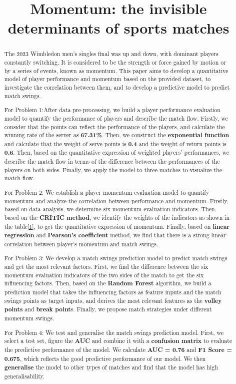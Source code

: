 \documentclass[12pt]{article}  %
\title{Momentum: the invisible determinants of sports matches}  %
\begin{document}
	
	\begin{abstract}
		The 2023 Wimbledon men's singles final was up and down, with dominant players constantly switching. It is considered to be the strength or force gained by motion or by a series of events, known as momentum. This paper aims to develop a quantitative model of player performance and momentum based on the provided dataset, to investigate the correlation between them, and to develop a predictive model to predict match swings.
		
		For Problem 1:After data pre-processing, we build a player performance evaluation model to quantify the performance of players and describe the match flow. Firstly, we consider that the points can reflect the performance of the players, and calculate the winning rate of the server as \textbf{67.31\%}. Then, we construct the \textbf{exponential function} and calculate that the weight of serve points is \textbf{0.4} and the weight of return points is \textbf{0.6}. Then, based on the quantitative expression of weighted players' performances, we describe the match flow in terms of the difference between the performances of the players on both sides. Finally, we apply the model to three matches to visualize the match flow.
		
		For Problem 2: We establish a player momentum evaluation model to quantify momentum and analyze the correlation between performance and momentum. Firstly, based on data analysis, we determine six momentum evaluation indicators. Then, based on the \textbf{CRITIC method}, we identify the weights of the indicators as shown in the table\ref{1}, to get the quantitative expression of momentum. Finally, based on \textbf{linear regression} and \textbf{Pearson's coefficient} method, we find that there is a strong linear correlation between player's momentum and match swings.
		
		For Problem 3: We develop a match swings prediction model to predict match swings and get the most relevant factors. First, we find the difference between the six momentum evaluation indicators of the two sides of the match to get the six influencing factors. Then, based on the \textbf{Random Forest} algorithm, we build a prediction model that takes the influencing factors as feature inputs and the match swings points as target inputs, and derives the most relevant features as the \textbf{volley points} and \textbf{break point}s. Finally, we propose match strategies under different momentum swings.
		
		For Problem 4: We test and generalise the match swings prediction model. First, we select a test set, figure the \textbf{AUC} and combine it with a \textbf{confusion matrix} to evaluate the predictive performance of the model. We calculate \textbf{AUC = 0.76} and \textbf{F1 Score = 0.675}, which reflects the good predictive performance of our model. We then \textbf{generalise} the model to other types of matches and find that the model has high generalisability.
		

\end{abstract}
\end{document}
